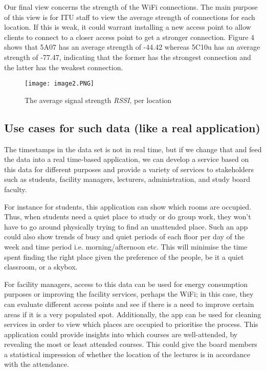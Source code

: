 \documentclass[format=acmsmall, review=false, screen=true]{acmart}
\begin{document}
Our final view concerns the strength of the WiFi connections. The main purpose of this view is for ITU staff to view the average strength of connections for each location. If this is weak, it could warrant installing a new access point to allow clients to connect to a closer access point to get a stronger connection. Figure 4 shows that 5A07 has an average strength of -44.42 whereas 5C10u has an average strength of -77.47, indicating that the former has the strongest connection and the latter has the weakest connection.

\begin{figure}[H]
  \texttt{[image: image2.PNG]}
  \caption{The average signal strength \textit{RSSI}, per location}
  \label{fig:main-diagram}
\end{figure}

\subsection{Use cases for such data (like a real application)}
The timestamps in the data set is not in real time, but if we change that and feed the data into a real time-based application, we can develop a service based on this data for different purposes and provide a variety of services to stakeholders such as students, facility managers, lecturers, administration, and study board faculty.

For instance for students, this application can show which rooms are occupied. Thus, when students need a quiet place to study or do group work, they won't have to go around physically trying to find an unattended place. Such an app could also show trends of busy and quiet periods of each floor per day of the week and time period i.e. morning/afternoon etc. This will minimise the time spent finding the right place given the preference of the people, be it a quiet classroom, or a skybox.

For facility managers, access to this data can be used for energy consumption purposes or improving the facility services, perhaps the WiFi; in this case, they can evaluate different access points and see if there is a need to improve certain areas if it is a very populated spot. Additionally, the app can be used for cleaning services in order to view which places are occupied to prioritise the process.
This application could provide insights into which courses are well-attended, by revealing the most or least attended courses. This could give the board members a statistical impression of whether the location of the lectures is in accordance with the attendance.
\end{document}
